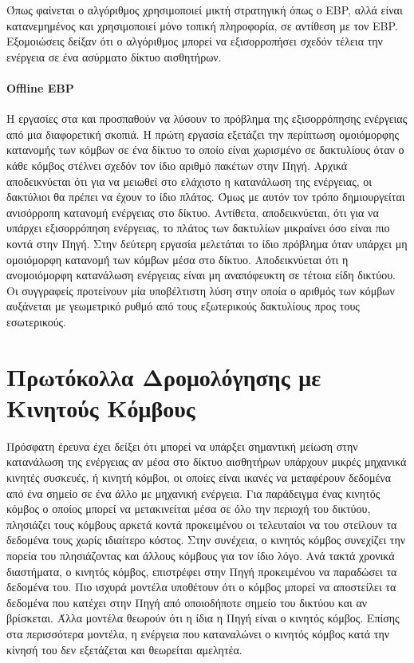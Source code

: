 Όπως φαίνεται ο αλγόριθμος χρησιμοποιεί μικτή στρατηγική όπως ο EBP, αλλά είναι κατανεμημένος και χρησιμοποιεί μόνο τοπική πληροφορία, σε αντίθεση με τον EBP.
Εξομοιώσεις δείξαν ότι ο αλγόριθμος μπορεί να εξισορροπήσει σχεδόν τέλεια την ενέργεια σε ένα ασύρματο δίκτυο αισθητήρων.

\paragraph{Offline EBP} H εργασίες στα \cite{oebp_protocol1} και \cite{oebp_protocol2} προσπαθούν να λύσουν το πρόβλημα της εξισορρόπησης ενέργειας από μια
διαφορετική σκοπιά. Η πρώτη εργασία εξετάζει την περίπτωση ομοιόμορφης κατανομής των κόμβων σε ένα δίκτυο το οποίο είναι χωρισμένο σε δακτυλίους όταν ο κάθε κόμβος
στέλνει σχεδόν τον ίδιο αριθμό πακέτων στην Πηγή. Αρχικά αποδεικνύεται ότι για να μειωθεί στο ελάχιστο η κατανάλωση της ενέργειας, οι δακτύλιοι θα πρέπει να έχουν το
ίδιο πλάτος. Όμως με αυτόν τον τρόπο δημιουργείται ανισόρροπη κατανομή ενέργειας στο δίκτυο. Αντίθετα, αποδεικνύεται, ότι για να υπάρχει εξισορρόπηση ενέργειας, το
πλάτος των δακτυλίων μικραίνει όσο είναι πιο κοντά στην Πηγή. Στην δεύτερη εργασία μελετάται το ίδιο πρόβλημα όταν υπάρχει μη ομοιόμορφη κατανομή των κόμβων μέσα στο
δίκτυο. Αποδεικνύεται ότι η ανομοιόμορφη κατανάλωση ενέργειας είναι μη αναπόφευκτη σε τέτοια είδη δικτύου. Οι συγγραφείς προτείνουν μία υποβέλτιστη λύση στην οποία ο
αριθμός των κόμβων αυξάνεται με γεωμετρικό ρυθμό από τους εξωτερικούς δακτυλίους προς τους εσωτερικούς.


\section{Πρωτόκολλα Δρομολόγησης με Κινητούς Κόμβους}
Πρόσφατη έρευνα έχει δείξει ότι μπορεί να υπάρξει σημαντική μείωση στην κατανάλωση της ενέργειας αν μέσα στο δίκτυο αισθητήρων υπάρχουν μικρές μηχανικά κινητές
συσκευές, ή κινητή κόμβοι, οι οποίες είναι ικανές να μεταφέρουν δεδομένα από ένα σημείο σε ένα άλλο με μηχανική ενέργεια. Για παράδειγμα ένας κινητός κόμβος ο οποίος
μπορεί να μετακινείται μέσα σε όλο την περιοχή του δικτύου, πλησιάζει τους κόμβους αρκετά κοντά προκειμένου οι τελευταίοι να του στείλουν τα δεδομένα τους χωρίς
ιδιαίτερο κόστος. Στην συνέχεια, ο κινητός κόμβος συνεχίζει την πορεία του πλησιάζοντας και άλλους κόμβους για τον ίδιο λόγο. Ανά τακτά χρονικά διαστήματα, ο
κινητός κόμβος, επιστρέφει στην Πηγή προκειμένου να παραδώσει τα δεδομένα του. Πιο ισχυρά μοντέλα υποθέτουν ότι ο κόμβος μπορεί να αποστείλει τα δεδομένα που κατέχει
στην Πηγή από οποιοδήποτε σημείο του δικτύου και αν βρίσκεται. Άλλα μοντέλα θεωρούν ότι η ίδια η Πηγή είναι ο κινητός κόμβος. Επίσης στα περισσότερα μοντέλα, η
ενέργεια που καταναλώνει ο κινητός κόμβος κατά την κίνησή του δεν εξετάζεται και θεωρείται αμελητέα.

